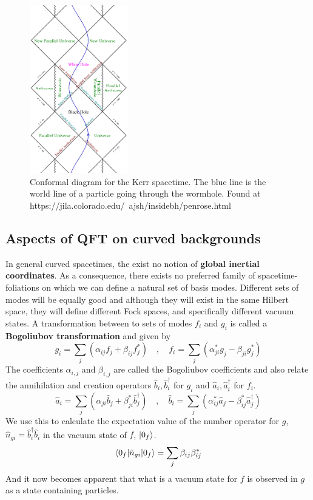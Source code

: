 \begin{figure}[h!]
%
\centering
%
\includegraphics[width=0.38\textwidth]{../pics/penrose_kerr.png}
%
\caption{Conformal diagram for the Kerr spacetime. The blue line is the world line of a particle going through the wormhole. Found at https://jila.colorado.edu/~ajsh/insidebh/penrose.html}
%
\label{fig:conformal_SW}
%
\end{figure}


\subsection{Aspects of QFT on curved backgrounds}
In general curved spacetimes, the exist no notion of \textbf{global inertial coordinates}. As a consequence, there exists no preferred family of spacetime-foliations on which we can define a natural set of basis modes. Different sets of modes will be equally good and although they will exist in the same Hilbert space, they will define different Fock spaces, and specifically different vacuum states. A transformation between to sets of modes $f_i$ and $g_i$ is called a \textbf{Bogoliubov transformation} and given by \cite{GR}
%
%
\begin{equation}
g_i = \sum_j \left( \alpha_{i j} f_j + \beta_{i j} f_j^* \right) \quad , \quad
f_i = \sum_j \left( \alpha^*_{j i} g_j - \beta_{j i} g_j^* \right)
\end{equation}
%
%
The coefficients $\alpha_{i,j}$ and $\beta_{i,j}$ are called the Bogoliubov coefficients and also relate the annihilation and creation operators $\hat{b}_i, \hat{b}_i^{\dagger}$ for $g_i$ and $\hat{a}_i, \hat{a}_i^{\dagger}$ for $f_i$. 
%
%
\begin{equation}
\hat{a}_i = \sum_j \left( \alpha_{j i} \hat{b}_j + \beta_{j i}^* \hat{b}_j^{\dagger} \right) \quad , \quad
\hat{b}_i = \sum_j \left( \alpha^*_{i j} \hat{a}_j - \beta_{i j}^* \hat{a}_j^{\dagger} \right)
\end{equation}
%
%
We use this to calculate the expectation value of the number operator for $g$, $\hat{n}_{g i} = \hat{b}_{i}^{\dagger} \hat{b}_{i}$ in the vacuum state of $f$, $\ket{0_f}$.
%
%
\begin{equation}
\braket{0_f | \hat{n}_{g i} | 0_f} = \sum_{j} \beta_{i j} \beta_{i j}^* 
\end{equation}
%
%
And it now becomes apparent that what is a vacuum state for $f$ is observed in $g$ as a state containing particles.


